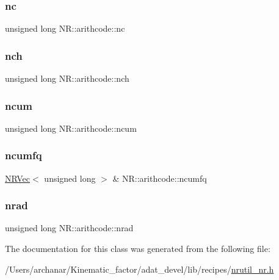 \subsubsection{\texorpdfstring{nc}{nc}}
{\footnotesize\ttfamily unsigned long N\+R\+::arithcode\+::nc}

\mbox{\label{classNR_1_1arithcode_adff76993d50ef77b4aa6f937dac31fb9}} 
\subsubsection{\texorpdfstring{nch}{nch}}
{\footnotesize\ttfamily unsigned long N\+R\+::arithcode\+::nch}

\mbox{\label{classNR_1_1arithcode_a942d481da12f999dd8a6a6cdf701eb13}} 
\subsubsection{\texorpdfstring{ncum}{ncum}}
{\footnotesize\ttfamily unsigned long N\+R\+::arithcode\+::ncum}

\mbox{\label{classNR_1_1arithcode_ab42f8b311dc85df156a07c70ce179a59}} 
\subsubsection{\texorpdfstring{ncumfq}{ncumfq}}
{\footnotesize\ttfamily \mbox{\hyperlink{classNR_1_1NRVec}{N\+R\+Vec}}$<$ unsigned long $>$ \& N\+R\+::arithcode\+::ncumfq}

\mbox{\label{classNR_1_1arithcode_a5f878b2a52dbcbd16e23593f6510959c}} 
\subsubsection{\texorpdfstring{nrad}{nrad}}
{\footnotesize\ttfamily unsigned long N\+R\+::arithcode\+::nrad}



The documentation for this class was generated from the following file\+:\begin{DoxyCompactItemize}
\item 
/\+Users/archanar/\+Kinematic\+\_\+factor/adat\+\_\+devel/lib/recipes/\mbox{\hyperlink{lib_2recipes_2nrutil__nr_8h}{nrutil\+\_\+nr.\+h}}\end{DoxyCompactItemize}
